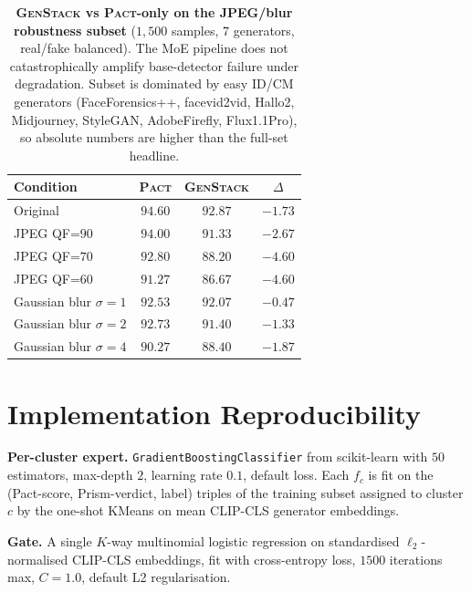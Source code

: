 \documentclass[10pt,twocolumn,letterpaper]{article}
\newcommand{\vfive}{\textsc{Pact}}
\begin{document}
\begin{table}[h]
\centering
\footnotesize
\setlength{\tabcolsep}{4pt}
\caption{\textbf{\textsc{GenStack} vs \vfive{}-only on the JPEG/blur robustness subset} ($1{,}500$ samples, $7$ generators, real/fake balanced). The MoE pipeline does not catastrophically amplify base-detector failure under degradation. Subset is dominated by easy ID/CM generators (FaceForensics++, facevid2vid, Hallo2, Midjourney, StyleGAN, AdobeFirefly, Flux1.1Pro), so absolute numbers are higher than the full-set headline.}
\label{tab:gs_robust}
\begin{tabular}{l c c c}
\toprule
Condition & \vfive{} & \textsc{GenStack} & $\Delta$ \\
\midrule
Original                       & $94.60$ & $92.87$ & $-1.73$ \\
JPEG QF=$90$                   & $94.00$ & $91.33$ & $-2.67$ \\
JPEG QF=$70$                   & $92.80$ & $88.20$ & $-4.60$ \\
JPEG QF=$60$                   & $91.27$ & $86.67$ & $-4.60$ \\
Gaussian blur $\sigma{=}1$     & $92.53$ & $92.07$ & $-0.47$ \\
Gaussian blur $\sigma{=}2$     & $92.73$ & $91.40$ & $-1.33$ \\
Gaussian blur $\sigma{=}4$     & $90.27$ & $88.40$ & $-1.87$ \\
\bottomrule
\end{tabular}
\end{table}

\section{Implementation Reproducibility}
\label{sec:repro}

\noindent\textbf{Per-cluster expert.} \texttt{GradientBoostingClassifier} from scikit-learn with $50$ estimators, max-depth $2$, learning rate $0.1$, default loss. Each $f_c$ is fit on the (Pact-score, Prism-verdict, label) triples of the training subset assigned to cluster $c$ by the one-shot KMeans on mean CLIP-CLS generator embeddings.

\noindent\textbf{Gate.} A single $K$-way multinomial logistic regression on standardised $\ell_2$-normalised CLIP-CLS embeddings, fit with cross-entropy loss, $1500$ iterations max, $C{=}1.0$, default L2 regularisation.
\end{document}
